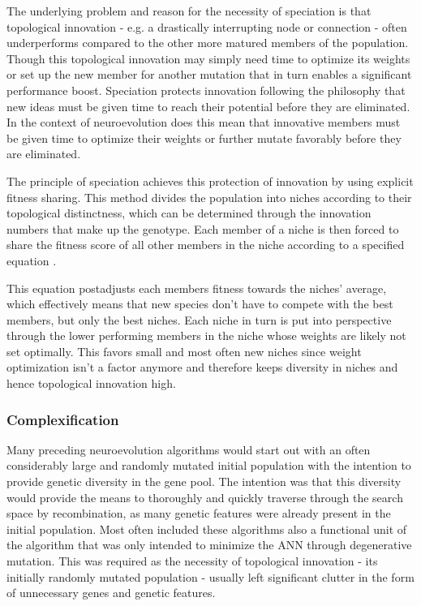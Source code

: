 \documentclass[journal, a4paper]{IEEEtran}
\begin{document}
The underlying problem and reason for the necessity of speciation is that topological innovation - e.g. a drastically interrupting node or connection - often underperforms compared to the other more matured members of the population. Though this topological innovation may simply need time to optimize its weights or set up the new member for another mutation that in turn enables a significant performance boost. Speciation protects innovation following the philosophy that new ideas must be given time to reach their potential before they are eliminated. In the context of neuroevolution does this mean that innovative members must be given time to optimize their weights or further mutate favorably before they are eliminated.

The principle of speciation achieves this protection of innovation by using explicit fitness sharing. This method divides the population into niches according to their topological distinctness, which can be determined through the innovation numbers that make up the genotype. Each member of a niche is then forced to share the fitness score of all other members in the niche according to a specified equation \cite[chap 3.3]{sta04}.

This equation postadjusts each members fitness towards the niches' average, which effectively means that new species don't have to compete with the best members, but only the best niches. Each niche in turn is put into perspective through the lower performing members in the niche whose weights are likely not set optimally. This favors small and most often new niches since weight optimization isn't a factor anymore and therefore keeps diversity in niches and hence topological innovation high. 



\subsubsection{\textbf{Complexification}}
Many preceding neuroevolution algorithms would start out with an often considerably large and randomly mutated initial population with the intention to provide genetic diversity in the gene pool. The intention was that this diversity would provide the means to thoroughly and quickly traverse through the search space by recombination, as many genetic features were already present in the initial population. Most often included these algorithms also a functional unit of the algorithm that was only intended to minimize the ANN through degenerative mutation. This was required as the necessity of topological innovation - its initially randomly mutated population - usually left significant clutter in the form of unnecessary genes and genetic features.
\end{document}
